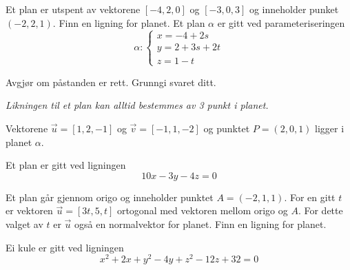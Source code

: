 \nes
{}
Et plan er utspent av vektorene $ [-4, 2, 0] $ og $ [-3, 0, 3] $ og inneholder punket $ (-2, 2, 1) $. Finn en ligning for planet.
\newpage
{}
Et plan $ \alpha $ er gitt ved parameteriseringen
\[\alpha: \left\lbrace{
	\begin{array}{l}
	x=-4 + 2s  \\
	y= 2+ 3s + 2t   \\
	z= 1-t 
	\end{array}
}\right. \]

Avgjør om påstanden er rett. Grunngi svaret ditt.
\begin{center}
\textit{Likningen til et plan kan alltid bestemmes av 3 punkt i planet.}	
\end{center}

Vektorene $\vec{u}=[1, 2, -1]$ og $\vec{v}=[-1, 1, -2]$ og punktet $P=(2, 0, 1)$ ligger i planet $\alpha$.

Et plan er gitt ved ligningen
\[ 10x-3y-4z=0 \]

Et plan går gjennom origo og inneholder punktet $ A=(-2, 1, 1) $. For en gitt $ t $ er vektoren $ \vec{u}=[3t, 5, t] $ ortogonal med vektoren mellom origo og $ A $. For dette valget av $ t $ er $ \vec{u} $ også en normalvektor for planet. Finn en ligning for planet.

Ei kule er gitt ved ligningen
\[ x^2 + 2 x + y^2 - 4 y + z^2 - 12 z + 32 = 0  \]
 

